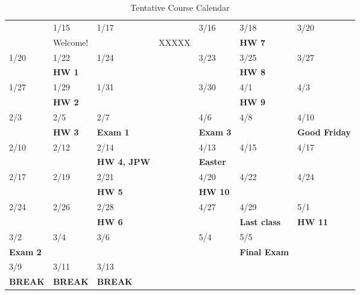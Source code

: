 \documentclass[11pt]{article}
\begin{document}
\begin{table}[htbp]
\caption{Tentative Course Calendar}
\centering
\begin{tabular}{lllllll}
\hline
 & 1/15 & 1/17 &  & 3/16 & 3/18 & 3/20\\
 & Welcome! &  & XXXXX &  & \textbf{HW 7} & \\
\hline
1/20 & 1/22 & 1/24 &  & 3/23 & 3/25 & 3/27\\
 & \textbf{HW 1} &  &  &  & \textbf{HW 8} & \\
\hline
1/27 & 1/29 & 1/31 &  & 3/30 & 4/1 & 4/3\\
 & \textbf{HW 2} &  &  &  & \textbf{HW 9} & \\
\hline
2/3 & 2/5 & 2/7 &  & 4/6 & 4/8 & 4/10\\
 & \textbf{HW 3} & \textbf{Exam 1} &  & \textbf{Exam 3} &  & \textbf{Good Friday}\\
\hline
2/10 & 2/12 & 2/14 &  & 4/13 & 4/15 & 4/17\\
 &  & \textbf{HW 4, JPW} &  & \textbf{Easter} &  & \\
\hline
2/17 & 2/19 & 2/21 &  & 4/20 & 4/22 & 4/24\\
 &  & \textbf{HW 5} &  & \textbf{HW 10} &  & \\
\hline
2/24 & 2/26 & 2/28 &  & 4/27 & 4/29 & 5/1\\
 &  & \textbf{HW 6} &  &  & \textbf{Last class} & \textbf{HW 11}\\
\hline
3/2 & 3/4 & 3/6 &  & 5/4 & 5/5 & \\
\textbf{Exam 2} &  &  &  &  & \textbf{Final Exam} & \\
\hline
3/9 & 3/11 & 3/13 &  &  &  & \\
\textbf{BREAK} & \textbf{BREAK} & \textbf{BREAK} &  &  &  & \\
\hline
\end{tabular}
\end{table}
\end{document}
